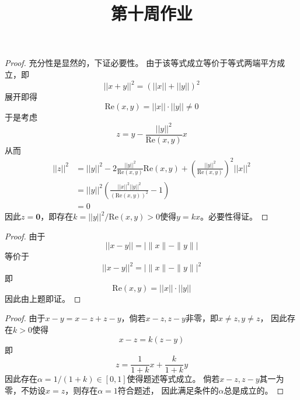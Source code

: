 \documentclass[cn]{homework}
\title{第十周作业}
\newcommand{\re}{\mathrm{Re}}
\begin{document}
    \maketitle

    \problem
    \label{pb:scale}
    \begin{subproblem}[(\arabic*)]
        \item
        \begin{proof}
            充分性是显然的，下证必要性。
            由于该等式成立等价于等式两端平方成立，即
            \[||x+y||^2=(||x||+||y||)^2\]
            展开即得
            \[\re(x,y)=||x||\cdot||y||\neq 0\]
            于是考虑
            \[z=y-\frac{||y||^2}{\re(x,y)}x\]
            从而
            \[\begin{aligned}
               ||z||^2&=||y||^2-2\frac{||y||^2}{\re(x,y)}\re(x,y)
               +\left(\frac{||y||^2}{\re(x,y)}\right)^2||x||^2\\
               &=||y||^2\left(\frac{||x||^2||y||^2}{\left(\re(x,y)\right)^2}-1\right)\\
               &=0
            \end{aligned}\]
            因此$z=\boldsymbol 0$，即存在$k=||y||^2/\re(x,y)>0$使得$y=kx$。必要性得证。
        \end{proof}

        \item
        \begin{proof}
            由于
            \[||x-y||=\left|\|x\|-\|y\|\right|\]
            等价于
            \[||x-y||^2=\left|\|x\|-\|y\|\right|^2\]
            即
            \[\re(x,y)=||x||\cdot||y||\]
            因此由上题即证。
        \end{proof}

        \item
        \begin{proof}
            由于$x-y=x-z+z-y$，倘若$x-z,z-y$非零，即$x\neq z,y\neq z$，
            因此存在$k>0$使得
            \[x-z=k(z-y)\]
            即
            \[z=\frac{1}{1+k}x+\frac{k}{1+k}y\]
            因此存在$\alpha=1/(1+k)\in[0,1]$使得题述等式成立。
            倘若$x-z,z-y$其一为零，不妨设$x=z$，则存在$\alpha=1$符合题述，
            因此满足条件的$\alpha$总是成立的。
        \end{proof}
    \end{subproblem}
\end{document}
